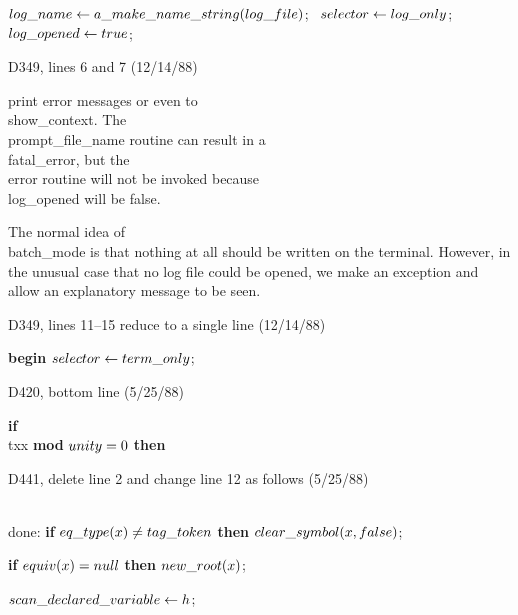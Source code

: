 \ninepoint\noindent\kern10pt
$\\{log\_name}\gets\\{a\_make\_name\_string}(\\{log\_file})$; \
$\\{selector}\gets\\{log\_only}$; \
$\\{log\_opened}\gets\\{true}$;

\bugonpage D349, lines 6 and 7 (12/14/88)

\tenpoint\noindent
print error messages or even to \\{show\_context}.
The \\{prompt\_file\_name} routine can result in a \\{fatal\_error},
but the \\{error}
routine will not be invoked because \\{log\_opened} will be false.
\par\noindent\hskip10pt
The normal idea of \\{batch\_mode} is that nothing at all should be written
on the terminal. However, in the unusual case that
no log file could be opened, we make an exception and allow
an explanatory message to be seen.

\bugonpage D349, lines 11--15 reduce to a single line (12/14/88)

\ninepoint\noindent\hskip10pt
{\bf begin} $\\{selector}\gets\\{term\_only}$;

\bugonpage D420, bottom line (5/25/88)

\ninepoint\noindent\kern30pt
{\bf if\/} \\{txx} {\bf mod} $\\{unity}=0$ {\bf then}

\bugonpage D441, delete line 2 and change line 12 as follows (5/25/88)

\ninepoint\noindent
\\{done}: {\bf if} $\\{eq\_type}(x)\ne\\{tag\_token}$ {\bf then}
 $\\{clear\_symbol}(x,\\{false})$;\par\noindent\kern10pt
{\bf if} $\\{equiv}(x)=\\{null}$ {\bf then} $\\{new\_root}(x)$;
\par\noindent\kern10pt
$\\{scan\_declared\_variable}\gets h$;

